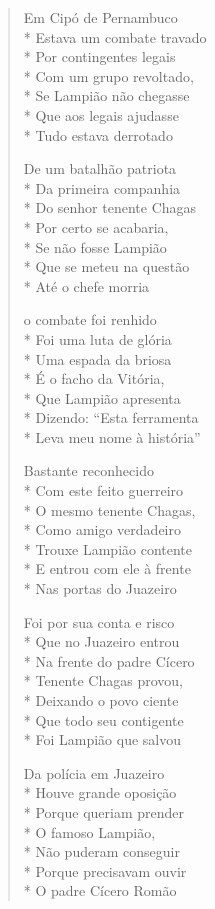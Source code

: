 \begin{verse}
Em Cipó de Pernambuco\\*
Estava um combate travado\\*
Por contingentes legais\\*
Com um grupo revoltado,\\*
Se Lampião não chegasse\\*
Que aos legais ajudasse\\*
Tudo estava derrotado

De um batalhão patriota\\*
Da primeira companhia\\*
Do senhor tenente Chagas\\*
Por certo se acabaria,\\*
Se não fosse Lampião\\*
Que se meteu na questão\\*
Até o chefe morria

o combate foi renhido\\*
Foi uma luta de glória\\*
Uma espada da briosa\\*
É o facho da Vitória,\\*
Que Lampião apresenta\\*
Dizendo: ``Esta ferramenta\\*
Leva meu nome à história''

Bastante reconhecido\\*
Com este feito guerreiro\\*
O mesmo tenente Chagas,\\*
Como amigo verdadeiro\\*
Trouxe Lampião contente\\*
E entrou com ele à frente\\*
Nas portas do Juazeiro

Foi por sua conta e risco\\*
Que no Juazeiro entrou\\*
Na frente do padre Cícero\\*
Tenente Chagas provou,\\*
Deixando o povo ciente\\*
Que todo seu contigente\\*
Foi Lampião que salvou

Da polícia em Juazeiro\\*
Houve grande oposição\\*
Porque queriam prender\\*
O famoso Lampião,\\*
Não puderam conseguir\\*
Porque precisavam ouvir\\*
O padre Cícero Romão


\end{verse}
